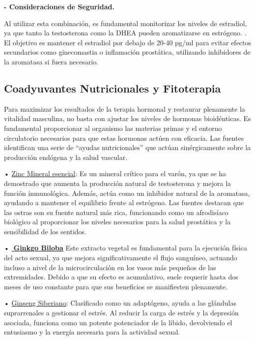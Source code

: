\documentclass[
  spanish,
]{article}
\begin{document}
\textbf{- Consideraciones de Seguridad.}

Al utilizar esta combinación, es fundamental monitorizar los niveles de estradiol, ya que tanto la testosterona como la DHEA pueden aromatizarse en estrógeno.
. El objetivo es mantener el estradiol por debajo de 20-40 pg/ml para evitar efectos secundarios como ginecomastia o inflamación prostática, utilizando inhibidores de la aromatasa si fuera necesario.

\subsection{Coadyuvantes Nutricionales y Fitoterapia}\label{coadyuvantes-nutricionales-y-fitoterapia}

Para maximizar los resultados de la terapia hormonal y restaurar plenamente la vitalidad masculina, no basta con ajustar los niveles de hormonas bioidénticas. Es fundamental proporcionar al organismo las materias primas y el entorno circulatorio necesarios para que estas hormonas actúen con eficacia. Las fuentes identifican una serie de ``ayudas nutricionales'' que actúan sinérgicamente sobre la producción endógena y la salud vascular.

• \href{https://metaph.es/es}{Zinc Mineral esencial}:
Es un mineral crítico para el varón, ya que se ha demostrado que aumenta la producción natural de testosterona y mejora la función inmunológica. Además, actúa como un inhibidor natural de la aromatasa, ayudando a mantener el equilibrio frente al estrógeno. Las fuentes destacan que las ostras son su fuente natural más rica, funcionando como un afrodisíaco biológico al proporcionar los niveles necesarios para la salud prostática y la sensibilidad de los sentidos.

• \textbf{\href{https://metaph.es/web/login?redirect=/es/shop/extracto-seco-ginkgo-biloba-tit-24-flavonglico-127452\%23attr\%3D215686}{🛒Ginkgo Biloba}}
Este extracto vegetal es fundamental para la ejecución física del acto sexual, ya que mejora significativamente el flujo sanguíneo, actuando incluso a nivel de la microcirculación en los vasos más pequeños de las extremidades. Debido a que su efecto es acumulativo, suele requerir hasta dos meses de uso constante para que sus beneficios se manifiesten plenamente.

• \href{https://metaph.es/es}{Ginseng Siberiano}:
Clasificado como un adaptógeno, ayuda a las glándulas suprarrenales a gestionar el estrés. Al reducir la carga de estrés y la depresión asociada, funciona como un potente potenciador de la libido, devolviendo el entusiasmo y la energía necesaria para la actividad sexual.
\end{document}
